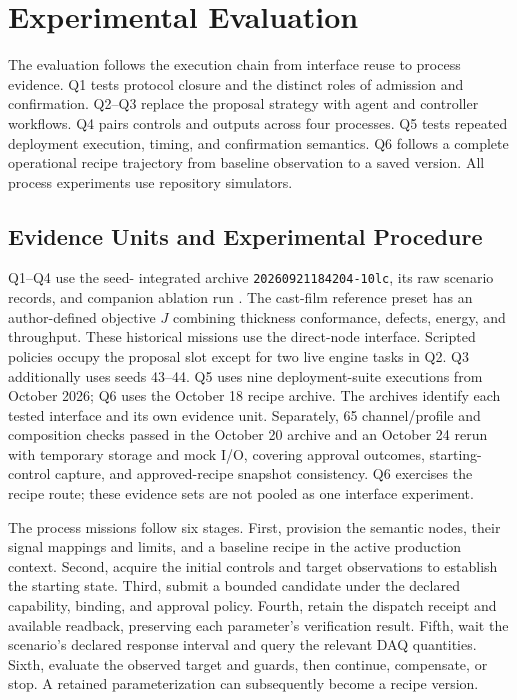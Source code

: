 \section{Experimental Evaluation}
\label{sec:eval}
The evaluation follows the execution chain from interface reuse to process
evidence. Q1 tests protocol closure and the distinct roles of admission and
confirmation. Q2--Q3 replace the proposal strategy with agent and controller
workflows. Q4 pairs controls and outputs across four processes. Q5 tests
repeated deployment execution, timing, and confirmation semantics. Q6
follows a complete operational recipe trajectory from baseline observation
to a saved version. All process experiments use repository simulators.

\subsection{Evidence Units and Experimental Procedure}
\label{sec:testbed}
\label{sec:procedure}
Q1--Q4 use the seed-\resSeed{} integrated archive
\texttt{20260921184204-10lc}, its raw scenario records, and companion ablation
run \resAblationRun. The cast-film reference preset has an author-defined
objective $J$ combining thickness conformance, defects, energy, and
throughput. These historical missions use the direct-node interface.
Scripted policies occupy the proposal slot except for two live engine
tasks in Q2. Q3 additionally uses seeds 43--44. Q5 uses nine
deployment-suite executions from October 2026; Q6 uses the October 18 recipe
archive. The archives identify each tested interface and its own evidence
unit. Separately, 65 channel/profile and composition checks passed in the
October 20 archive and an October 24 rerun with temporary storage and mock I/O,
covering approval outcomes, starting-control capture, and approved-recipe
snapshot consistency. Q6 exercises the recipe
route; these evidence sets are not pooled as one interface experiment.

The process missions follow six stages. First, provision the semantic nodes,
their signal mappings and limits, and a baseline recipe in the active
production context. Second, acquire the initial controls and target
observations to establish the starting state. Third, submit a bounded
candidate under the declared capability, binding, and approval policy.
Fourth, retain the dispatch receipt and available readback, preserving each
parameter's verification result. Fifth, wait the scenario's declared
response interval and query the relevant DAQ quantities. Sixth, evaluate
the observed target and guards, then continue, compensate, or stop. A
retained parameterization can subsequently become a recipe version.

